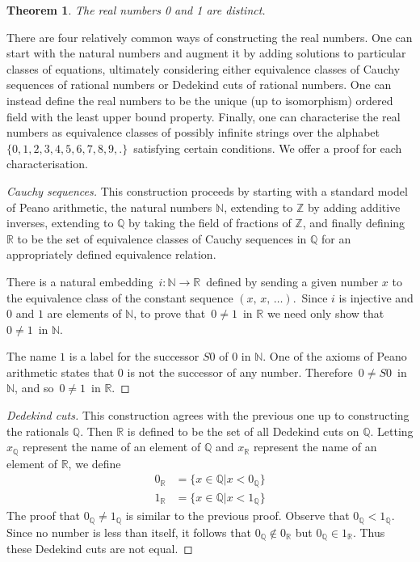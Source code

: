 \documentclass[12pt]{article}
\newtheorem*{theorem*}{Theorem}
\begin{document}
\begin{theorem*}
The real numbers 0 and 1 are distinct.
\end{theorem*}

There are four relatively common ways of constructing the real numbers.  One can start with the natural numbers and augment it by adding solutions to particular classes of equations, ultimately considering either equivalence classes of Cauchy sequences of rational numbers or Dedekind cuts of rational numbers.  One can instead define the real numbers to be the unique (up to isomorphism) ordered field with the least upper bound property.  Finally, one can characterise the real numbers as equivalence classes of possibly infinite strings over the alphabet\, $\{0,1,2,3,4,5,6,7,8,9,.\}$\, satisfying certain conditions.  We offer a proof for each characterisation.

\begin{proof}[Cauchy sequences]
This construction proceeds by starting with a standard model of Peano arithmetic, the natural numbers $\mathbb{N}$, extending to $\mathbb{Z}$ by adding additive inverses, extending to $\mathbb{Q}$ by taking the field of fractions of $\mathbb{Z}$, and finally defining $\mathbb{R}$ to be the set of equivalence classes of Cauchy sequences in $\mathbb{Q}$ for an appropriately defined equivalence relation.

There is a natural embedding\, $i\!:\mathbb{N}\to\mathbb{R}$\, defined by sending a given number $x$ to the equivalence class of the constant sequence $(x,\,x,\,\dots)$.\, Since $i$ is injective and $0$ and $1$ are elements of $\mathbb{N}$, to prove that\, $0\ne 1$\, in $\mathbb{R}$ we need only show that\, $0\ne 1$\, in $\mathbb{N}$.

The name $1$ is a label for the successor $S0$ of $0$ in $\mathbb{N}$.  One of the axioms of Peano arithmetic states that $0$ is not the successor of any number.  Therefore\, $0\ne S0$\, in $\mathbb{N}$, and so\, $0\ne 1$\, in $\mathbb{R}$.
\end{proof}

\begin{proof}[Dedekind cuts]
This construction agrees with the previous one up to constructing the rationals $\mathbb{Q}$.  Then $\mathbb{R}$ is defined to be the set of all Dedekind cuts on $\mathbb{Q}$.  Letting $x_{\mathbb{Q}}$ represent the name of an element of $\mathbb{Q}$ and $x_{\mathbb{R}}$ represent the name of an element of $\mathbb{R}$, we define
\begin{align*}
0_{\mathbb{R}} &= \{x\in\mathbb{Q} | x < 0_{\mathbb{Q}} \} \\
1_{\mathbb{R}} &= \{x\in\mathbb{Q} | x < 1_{\mathbb{Q}} \}
\end{align*}
The proof that $0_{\mathbb{Q}}\ne 1_{\mathbb{Q}}$ is similar to the previous proof.  Observe that
$0_{\mathbb{Q}} < 1_{\mathbb{Q}}$.  Since no number is less than itself, it follows that $0_{\mathbb{Q}}\notin 0_{\mathbb{R}}$ but
$0_{\mathbb{Q}}\in 1_{\mathbb{R}}$.  Thus these Dedekind cuts are not equal.
\end{proof}
\end{document}
